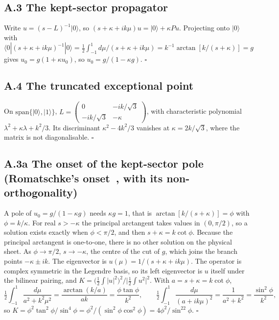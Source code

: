 \documentclass[11pt]{article}
\begin{document}
\subsection*{A.3 The kept-sector propagator}
Write $u=(s-L)^{-1}|0\rangle$, so $(s+\kappa+ik\mu)u=|0\rangle+\kappa Pu$. Projecting onto $|0\rangle$ with $\langle0|(s+\kappa+ik\mu)^{-1}|0\rangle=\tfrac12\int_{-1}^{1}d\mu/(s+\kappa+ik\mu)=k^{-1}\arctan[k/(s+\kappa)]=g$ gives $u_0=g(1+\kappa u_0)$, so $u_0=g/(1-\kappa g)$. $\square$
\subsection*{A.4 The truncated exceptional point}
On $\mathrm{span}\{|0\rangle,|1\rangle\}$, $L=\begin{pmatrix}0&-ik/\sqrt3\\-ik/\sqrt3&-\kappa\end{pmatrix}$, with characteristic polynomial $\lambda^2+\kappa\lambda+k^2/3$. Its discriminant $\kappa^2-4k^2/3$ vanishes at $\kappa=2k/\sqrt3$, where the matrix is not diagonalisable. $\square$
\subsection*{A.3a The onset of the kept-sector pole (Romatschke's onset~\cite[Eq.~(37)]{Rom}, with its non-orthogonality)}
A pole of $u_0=g/(1-\kappa g)$ needs $\kappa g=1$, that is $\arctan[k/(s+\kappa)]=\phi$ with $\phi=k/\kappa$. For real $s>-\kappa$ the principal arctangent takes values in $(0,\pi/2)$, so a solution exists exactly when $\phi<\pi/2$, and then $s+\kappa=k\cot\phi$. Because the principal arctangent is one-to-one, there is no other solution on the physical sheet. As $\phi\to\pi/2$, $s\to-\kappa$, the centre of the cut of $g$, which joins the branch points $-\kappa\pm ik$. The eigenvector is $u(\mu)=1/(s+\kappa+ik\mu)$. The operator is complex symmetric in the Legendre basis, so its left eigenvector is $u$ itself under the bilinear pairing, and $K=\big(\tfrac12\!\int|u|^2\big)^2/\big|\tfrac12\!\int u^2\big|^2$. With $a=s+\kappa=k\cot\phi$,
\[
\tfrac12\int_{-1}^{1}\frac{d\mu}{a^2+k^2\mu^2}=\frac{\arctan(k/a)}{ak}=\frac{\phi\tan\phi}{k^2},\qquad
\tfrac12\int_{-1}^{1}\frac{d\mu}{(a+ik\mu)^2}=\frac{1}{a^2+k^2}=\frac{\sin^2\phi}{k^2},
\]
so $K=\phi^2\tan^2\phi/\sin^4\phi=\phi^2/(\sin^2\phi\cos^2\phi)=4\phi^2/\sin^22\phi$. $\square$
\end{document}
